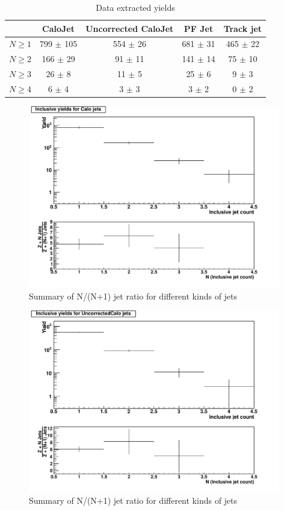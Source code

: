 \documentclass[10pt,a4paper,onecolumn]{article}
\begin{document}
\begin{table}
\caption{Data extracted yields}
\centering
   \begin{tabular}{|c|c|c|c|c|}
      \hline
      & CaloJet & Uncorrected CaloJet & PF Jet & Track jet \\\hline
      $N \ge 1$ & 799 $\pm$ 105 & 554 $\pm$ 26 & 681 $\pm$ 31 & 465 $\pm$ 22 \\\hline
      $N \ge 2$ & 166 $\pm$ 29 & 91 $\pm$ 11 & 141 $\pm$ 14 & 75 $\pm$ 10 \\\hline
      $N \ge 3$ & 26 $\pm$ 8 & 11 $\pm$ 5 & 25 $\pm$ 6 & 9 $\pm$ 3 \\\hline
      $N \ge 4$ & 6 $\pm$ 4 & 3 $\pm$ 3 & 3 $\pm$ 2 & 0 $\pm$ 2 \\\hline
   \end{tabular}
   \label{Table_DataExtractedYields}
\end{table}

\begin{figure}
   \includegraphics[width=110mm]{FinalPlot_FloatAll_Calo.pdf}
   \caption{Summary of N/(N+1) jet ratio for different kinds of jets}
   \label{Figure_RatioFromDataCaloJet}
\end{figure}

\begin{figure}
   \includegraphics[width=110mm]{FinalPlot_FloatAll_UncorrectedCalo.pdf}
   \caption{Summary of N/(N+1) jet ratio for different kinds of jets}
   \label{Figure_RatioFromDataUncorrectedCaloJet}
\end{figure}
\end{document}
